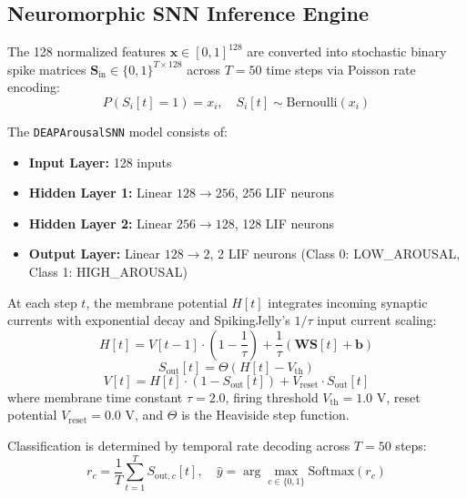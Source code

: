 \documentclass[conference]{IEEEtran}
\begin{document}
\subsection{Neuromorphic SNN Inference Engine}
The 128 normalized features $\mathbf{x} \in [0, 1]^{128}$ are converted into stochastic binary spike matrices $\mathbf{S}_{\text{in}} \in \{0, 1\}^{T \times 128}$ across $T=50$ time steps via Poisson rate encoding:
\begin{equation}
P(S_i[t] = 1) = x_i, \quad S_i[t] \sim \text{Bernoulli}(x_i)
\end{equation}

The \texttt{DEAPArousalSNN} model consists of:
\begin{itemize}
    \item \textbf{Input Layer:} 128 inputs
    \item \textbf{Hidden Layer 1:} Linear $128 \to 256$, 256 LIF neurons
    \item \textbf{Hidden Layer 2:} Linear $256 \to 128$, 128 LIF neurons
    \item \textbf{Output Layer:} Linear $128 \to 2$, 2 LIF neurons (Class 0: LOW\_AROUSAL, Class 1: HIGH\_AROUSAL)
\end{itemize}

At each step $t$, the membrane potential $H[t]$ integrates incoming synaptic currents with exponential decay and SpikingJelly's $1/\tau$ input current scaling:
\begin{equation}
H[t] = V[t-1] \cdot \left(1 - \frac{1}{\tau}\right) + \frac{1}{\tau} \left(\mathbf{W}\mathbf{S}[t] + \mathbf{b}\right)
\end{equation}
\begin{equation}
S_{\text{out}}[t] = \Theta(H[t] - V_{\text{th}})
\end{equation}
\begin{equation}
V[t] = H[t] \cdot (1 - S_{\text{out}}[t]) + V_{\text{reset}} \cdot S_{\text{out}}[t]
\end{equation}
where membrane time constant $\tau = 2.0$, firing threshold $V_{\text{th}} = 1.0$ V, reset potential $V_{\text{reset}} = 0.0$ V, and $\Theta$ is the Heaviside step function. 

Classification is determined by temporal rate decoding across $T=50$ steps:
\begin{equation}
r_c = \frac{1}{T} \sum_{t=1}^{T} S_{\text{out}, c}[t], \quad \hat{y} = \arg\max_{c \in \{0, 1\}} \text{Softmax}(r_c)
\end{equation}
\end{document}
